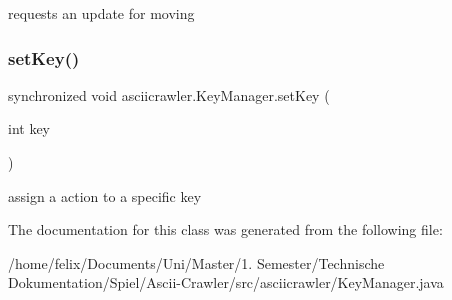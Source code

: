 requests an update for moving \mbox{\label{classasciicrawler_1_1KeyManager_a891959638b2c091d79b2401587198511}} 
\subsubsection{\texorpdfstring{set\+Key()}{setKey()}}
{\footnotesize\ttfamily synchronized void asciicrawler.\+Key\+Manager.\+set\+Key (\begin{DoxyParamCaption}\item[{int}]{key }\end{DoxyParamCaption})\hspace{0.3cm}{\ttfamily [inline]}}

assign a action to a specific key 

The documentation for this class was generated from the following file\+:\begin{DoxyCompactItemize}
\item 
/home/felix/\+Documents/\+Uni/\+Master/1. Semester/\+Technische Dokumentation/\+Spiel/\+Ascii-\/\+Crawler/src/asciicrawler/Key\+Manager.\+java\end{DoxyCompactItemize}
